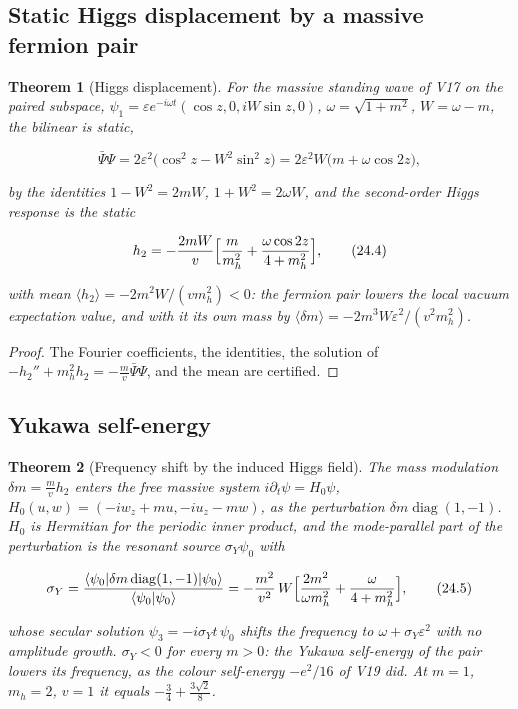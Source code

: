 \documentclass[11pt]{article}
\newtheorem{theorem}{Theorem}[section]
\theoremstyle{remark}
\begin{document}
\subsection{Static Higgs displacement by a massive fermion pair}

\begin{theorem}[Higgs displacement]
\label{thm:v20v21-displacement}
For the massive standing wave of V17 on the paired subspace,
\(\psi_1=\varepsilon e^{-i\omega t}(\cos z,0,iW\sin z,0)\),
\(\omega=\sqrt{1+m^2}\), \(W=\omega-m\), the bilinear is static,

\[
 \bar\Psi\Psi=2\varepsilon^2\bigl(\cos^2z-W^2\sin^2z\bigr)
 =2\varepsilon^2W\bigl(m+\omega\cos2z\bigr),                          \tag{24.3}
\]

by the identities \(1-W^2=2mW\), \(1+W^2=2\omega W\), and the
second-order Higgs response is the static

\[
 h_2=-\frac{2mW}{v}\Bigl[\frac m{m_h^2}+\frac{\omega\cos2z}{4+m_h^2}\Bigr],
                                                                    \tag{24.4}
\]

with mean \(\langle h_2\rangle=-2m^2W/(vm_h^2)<0\): the fermion pair
lowers the local vacuum expectation value, and with it its own mass by
\(\langle\delta m\rangle=-2m^3W\varepsilon^2/(v^2m_h^2)\).
\end{theorem}

\begin{proof}
The Fourier coefficients, the identities, the solution of
\(-h_2''+m_h^2h_2=-\tfrac mv\bar\Psi\Psi\), and the mean are certified.
\end{proof}

\subsection{Yukawa self-energy}

\begin{theorem}[Frequency shift by the induced Higgs field]
\label{thm:v20v21-shift}
The mass modulation \(\delta m=\tfrac mvh_2\) enters the free massive
system \(i\partial_t\psi=H_0\psi\), \(H_0(u,w)=(-iw_z+mu,-iu_z-mw)\), as
the perturbation \(\delta m\operatorname{diag}(1,-1)\).  \(H_0\) is
Hermitian for the periodic inner product, and the mode-parallel part
of the perturbation is the resonant source
\(\sigma_Y\psi_0\) with

\[
 \sigma_Y=\frac{\langle\psi_0|\delta m\operatorname{diag}(1,-1)|\psi_0\rangle}{\langle\psi_0|\psi_0\rangle}
 =-\frac{m^2}{v^2}\,W\Bigl[\frac{2m^2}{\omega m_h^2}+\frac{\omega}{4+m_h^2}\Bigr],
                                                                    \tag{24.5}
\]

whose secular solution \(\psi_3=-i\sigma_Yt\,\psi_0\) shifts the
frequency to \(\omega+\sigma_Y\varepsilon^2\) with no amplitude growth.
\(\sigma_Y<0\) for every \(m>0\): the Yukawa self-energy of the pair
lowers its frequency, as the colour self-energy \(-e^2/16\) of V19
did.  At \(m=1\), \(m_h=2\), \(v=1\) it equals
\(-\tfrac34+\tfrac{3\sqrt2}8\).
\end{theorem}
\end{document}

